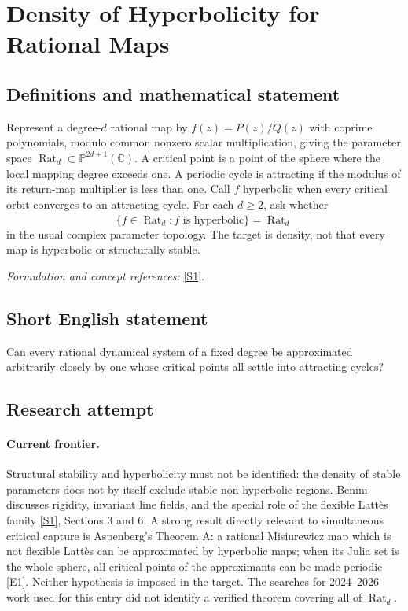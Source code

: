 \documentclass[11pt,a4paper]{article}
\newcommand{\C}{\mathbb{C}}
\newcommand{\PP}{\mathbb P}
\newcommand{\sref}[2]{\hyperlink{source:#1:#2}{[S#2]}}
\newcommand{\eref}[2]{\hyperlink{extra:#1:#2}{[E#2]}}
\newif\ifshowcatalogue
\newcommand{\cataloguescope}[1]{\ifshowcatalogue
 \paragraph{Exact scope in the supplied catalogue.}
 \begin{quote}\small #1\end{quote}\fi}
\numberwithin{equation}{section}
\begin{document}
\setcounter{section}{0}
\clearpage
\section*{\texorpdfstring{Density of Hyperbolicity for Rational Maps}{Density of Hyperbolicity for Rational Maps}}\label{statement}
\subsection{Definitions and mathematical statement}
Represent a degree-$d$ rational map by $f(z)=P(z)/Q(z)$ with coprime polynomials, modulo common nonzero scalar multiplication, giving the parameter space $\operatorname{Rat}_d\subset\PP^{2d+1}(\C)$. A critical point is a point of the sphere where the local mapping degree exceeds one. A periodic cycle is attracting if the modulus of its return-map multiplier is less than one. Call $f$ hyperbolic when every critical orbit converges to an attracting cycle. For each $d\ge2$, ask whether
\[
 \overline{\{f\in\operatorname{Rat}_d:f\text{ is hyperbolic}\}}=\operatorname{Rat}_d
\]
in the usual complex parameter topology. The target is density, not that every map is hyperbolic or structurally stable.
\par\smallskip\textit{Formulation and concept references:} \sref{statement}{1}.
\cataloguescope{Determine whether hyperbolic rational maps, whose critical points are all attracted to attracting periodic cycles, are dense in the space of rational maps of the Riemann sphere of each fixed degree d >= 2.}
\subsection{Short English statement}
Can every rational dynamical system of a fixed degree be approximated arbitrarily closely by one whose critical points all settle into attracting cycles?
\subsection{Research attempt}

\paragraph{Current frontier.}
Structural stability and hyperbolicity must not be identified: the density
of stable parameters does not by itself exclude stable non-hyperbolic
regions. Benini discusses rigidity, invariant line fields, and the special
role of the flexible Latt\`es family \sref{statement}{1}, Sections 3 and 6.
A strong result directly relevant to simultaneous critical capture is
Aspenberg's Theorem A: a rational Misiurewicz map which is not flexible
Latt\`es can be approximated by hyperbolic maps; when its Julia set is the
whole sphere, all critical points of the approximants can be made periodic
\eref{statement}{1}. Neither hypothesis is imposed in the target. The searches
for 2024--2026 work used for this entry did not identify a verified theorem
covering all of $\operatorname{Rat}_d$.
\end{document}
